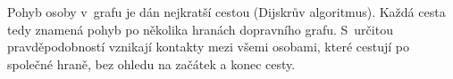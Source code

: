 
Pohyb osoby v~grafu je dán nejkratší cestou (Dijskrův algoritmus). Každá cesta tedy znamená pohyb po několika hranách dopravního grafu. S~určitou pravděpodobností vznikají kontakty mezi všemi osobami, které cestují po společné hraně, bez ohledu na začátek a konec cesty. 








